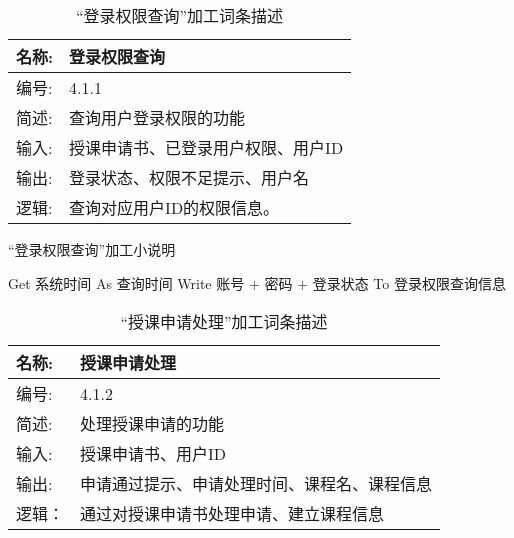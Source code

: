 \begin{table}[H]  
\caption{“登录权限查询”加工词条描述}  
\begin{center}  
    \begin{tabular}{l p{11cm}} 
        \hline
        \quad 名称: & 登录权限查询 \\
        \hline
        \quad 编号: & 4.1.1 \\
        \hline
        \quad 简述: & 查询用户登录权限的功能 \\
        \hline
        \quad 输入: & 授课申请书、已登录用户权限、用户ID \\
        \hline
        \quad 输出: & 登录状态、权限不足提示、用户名 \\
        \hline
        \quad 逻辑: & 查询对应用户ID的权限信息。 \\
        \hline
    \end{tabular}
    \label{tab1}
\end{center}
\end{table}


\begin{algorithm}[H] 
    \renewcommand{\thealgorithm}{}
    \caption{“登录权限查询”加工小说明} 
    \label{alg3} 
    \begin{algorithmic}[1]
        \STATE Get 系统时间 As 查询时间
        \STATE Write 账号 + 密码 + 登录状态  To 登录权限查询信息 
    \end{algorithmic} 
\end{algorithm}

\begin{table}[H]  
\caption{“授课申请处理”加工词条描述}  
\begin{center}  
    \begin{tabular}{l p{11cm}} 
        \hline
        \quad 名称: & 授课申请处理 \\
        \hline
        \quad 编号: & 4.1.2 \\
        \hline
        \quad 简述: & 处理授课申请的功能 \\
        \hline
        \quad 输入: & 授课申请书、用户ID \\
        \hline
        \quad 输出: & 申请通过提示、申请处理时间、课程名、课程信息 \\
        \hline
        \quad 逻辑： & 通过对授课申请书处理申请、建立课程信息 \\
        \hline
    \end{tabular}
    \label{tab1}
\end{center}
\end{table}


